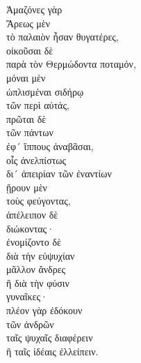 {\large
\begin{greek}
\noindent Ἀμαζόνες γὰρ \\
\tabto{2em} Ἄρεως μὲν \\
\tabto{4em} τὸ παλαιὸν ἦσαν θυγατέρες, \\
\tabto{2em} οἰκοῦσαι δὲ \\
\tabto{4em} παρὰ τὸν Θερμώδοντα ποταμόν, \\
\tabto{2em} μόναι μὲν \\
\tabto{4em} ὡπλισμέναι σιδήρῳ \\
\tabto{6em} τῶν περὶ αὐτάς, \\
\tabto{2em} πρῶται δὲ \\
\tabto{4em} τῶν πάντων \\
\tabto{6em} ἐφ´ ἵππους ἀναβᾶσαι, \\
\tabto{8em} οἷς ἀνελπίστως \\
\tabto{8em} δι´ ἀπειρίαν τῶν ἐναντίων \\
\tabto{8em} ᾕρουν μὲν \\
\tabto{10em} τοὺς φεύγοντας, \\
\tabto{8em} ἀπέλειπον δὲ \\
\tabto{10em} διώκοντας·\\
ἐνομίζοντο δὲ \\
\tabto{2em} διὰ τὴν εὐψυχίαν \\
\tabto{4em} μᾶλλον ἄνδρες \\
\tabto{2em} ἢ διὰ τὴν φύσιν \\
\tabto{4em} γυναῖκες·\\
\tabto{2em} πλέον γὰρ ἐδόκουν \\
\tabto{4em} τῶν ἀνδρῶν \\
\tabto{6em} ταῖς ψυχαῖς διαφέρειν \\
\tabto{6em} ἢ ταῖς ἰδέαις ἐλλείπειν.\\

\end{greek}
}

